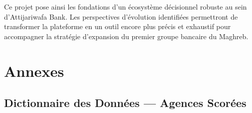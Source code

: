 \documentclass[11pt,a4paper,twoside]{report}
\begin{document}
Ce projet pose ainsi les fondations d'un écosystème décisionnel robuste au sein d'Attijariwafa Bank. Les perspectives d'évolution identifiées permettront de transformer la plateforme en un outil encore plus précis et exhaustif pour accompagner la stratégie d'expansion du premier groupe bancaire du Maghreb.

\appendix
\chapter{Annexes}

\section{Dictionnaire des Données --- Agences Scorées}
\end{document}
